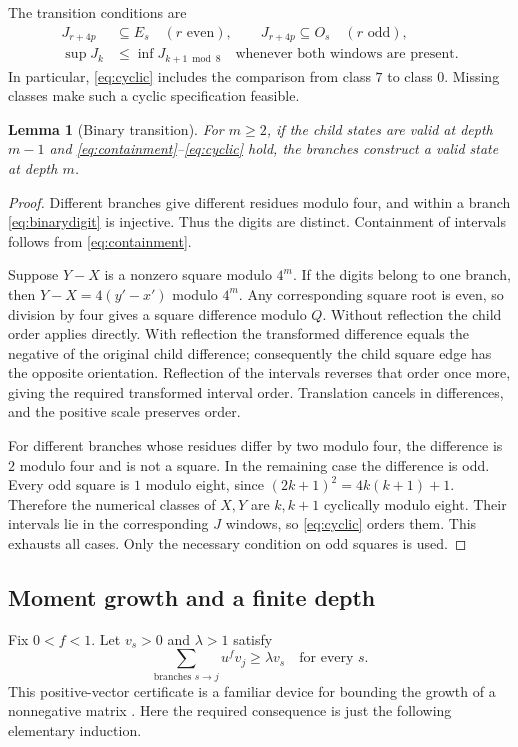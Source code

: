 \documentclass[11pt]{article}
\newtheorem{lemma}[theorem]{Lemma}
\theoremstyle{definition}
\theoremstyle{remark}
\begin{document}
The transition conditions are
\begin{align}
 J_{r+4p}&\subseteq E_s\quad(r\text{ even}),\qquad
 J_{r+4p}\subseteq O_s\quad(r\text{ odd}),\label{eq:containment}\\
 \sup J_k&\le\inf J_{k+1\bmod8}
 \quad\text{whenever both windows are present}.\label{eq:cyclic}
\end{align}
In particular, \eqref{eq:cyclic} includes the comparison from class $7$
to class $0$. Missing classes make such a cyclic specification feasible.

\begin{lemma}[Binary transition]\label{lem:binary}
For $m\ge2$, if the child states are valid at depth $m-1$ and
\eqref{eq:containment}--\eqref{eq:cyclic} hold, the branches construct a
valid state at depth $m$.
\end{lemma}
\begin{proof}
Different branches give different residues modulo four, and within a
branch \eqref{eq:binarydigit} is injective. Thus the digits are distinct.
Containment of intervals follows from \eqref{eq:containment}.

Suppose $Y-X$ is a nonzero square modulo $4^m$. If the digits belong to
one branch, then $Y-X=4(y'-x')$ modulo $4^m$. Any corresponding square root
is even, so division by four gives a square difference modulo $Q$.
Without reflection the child order applies directly. With reflection the
transformed difference equals the negative of the original child
difference; consequently the child square edge has the opposite orientation.
Reflection of the intervals reverses that order once more, giving the
required transformed interval order. Translation cancels in differences,
and the positive scale preserves order.

For different branches whose residues differ by two modulo four, the
difference is $2$ modulo four and is not a square. In the remaining case
the difference is odd. Every odd square is $1$ modulo eight, since
$(2k+1)^2=4k(k+1)+1$. Therefore the numerical classes of $X,Y$ are
$k,k+1$ cyclically modulo eight. Their intervals lie in the corresponding
$J$ windows, so \eqref{eq:cyclic} orders them. This exhausts all cases.
Only the necessary condition on odd squares is used.
\end{proof}

\subsection{Moment growth and a finite depth}
Fix $0<f<1$. Let $v_s>0$ and $\lambda>1$ satisfy
\begin{equation}\label{eq:rows}
 \sum_{\text{branches }s\to j}u^f v_j\ge \lambda v_s\quad\text{for every }s.
\end{equation}
This positive-vector certificate is a familiar device for bounding the
growth of a nonnegative matrix \cite{Seneta2006}. Here the required
consequence is just the following elementary induction.
\end{document}
